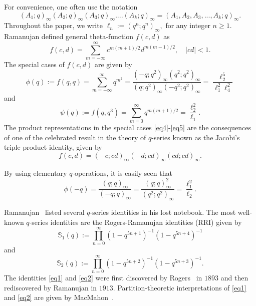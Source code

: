 \documentclass[12pt]{article}
\renewcommand{\(}{\left\(}
\renewcommand{\)}{\right\)}
\renewcommand{\[}{\left[}
\renewcommand{\]}{\right]}
\numberwithin{equation}{section}
\theoremstyle{plain}
\begin{document}
		For convenience, one often use the notation
		$$(A_{1};q)_{\infty}(A_{2};q)_{\infty}(A_{3};q)_{\infty}....(A_{k};q)_{\infty} = (A_{1},A_{2},A_{3},...,A_{k};q)_{\infty}.$$
		Throughout the paper, we write $\ell _{n} := (q^n;q^n)_{\infty},$ for any integer $n\geq1$. Ramanujan defined general theta-function $f(c,d)$ \cite[p. 34, (18.1)]{BBC} as
		\begin{equation}\label{eq3}
		f(c,d) = \sum_{m={-}\infty}^{\infty}c^{m(m+1)/2}d^{m(m-1)/2},  \quad                |cd|<1.
		\end{equation}The special cases \cite[p. 35, Entry 18]{BBC} of $f(c,d)$ are given by 
		\begin{equation}\label{eq4}
		\phi(q) := f(q,q) = \sum_{m={-}\infty}^{\infty}q^{{m}^2}=\frac{(-q;q^2)_\infty (q^2;q^2)_\infty}{(q;q^2)_\infty (-q^2;q^2)_\infty} = \frac{\ell_{2}^{5} }{{\ell_{1}^2}{\ell_{4}^2}} 
		\end{equation} and
		\begin{equation}\label{eq5}
		\psi(q) := f(q,q^3) = \sum_{m=0}^{\infty}q^{m(m+1)/2} = \frac{\ell_{2}^2}{\ell_{1}}.
		\end{equation}The product representations in the special cases \eqref{eq4}-\eqref{eq5} are the consequences of one of the celebrated result in the theory of $q$-series known as the Jacobi's triple product identity, given by
		\begin{equation}\label{jaco}f(c,d)= (-c;cd)_{\infty}(-d;cd)_{\infty}(cd;cd)_{\infty}.\end{equation}
	
		By using elementary $q$-operations, it is easily seen that
		\begin{equation}\label{eq6}
		\phi(-q)=\frac{(q;q)_\infty}{(-q;q)_\infty} = \frac{(q;q)_{\infty}^2}{(q ^2;q^2)_{\infty}} = \frac{\ell_{1}^2}{\ell_{2}}.
		\end{equation}
		
		Ramanujan~\cite{lostp2} listed several $q$-series identities in his lost notebook. The most well-known $q$-series identities are the Rogers-Ramanujan identities (RRI) given by
		\begin{equation}\label{eq1}
		\mathbb{S}_1(q):= \prod_{n=0}^{\infty}(1-q^{5n+1})^{-1}(1-q^{5n+4})^{-1}
		\end{equation} and \begin{equation}\label{eq2}
		\mathbb{S}_2(q):=\prod_{n=0}^{\infty}(1-q^{5n+2})^{-1}(1-q^{5n+3})^{-1}.
		\end{equation}
		The identities \eqref{eq1} and \eqref{eq2}  were first discovered by Rogers~\cite{RL} in $1893$ and then rediscovered by Ramanujan in $1913$. Partition-theoretic interpretations of \eqref{eq1} and \eqref{eq2} are given by MacMahon~\cite{MM}.
		
\end{document}
